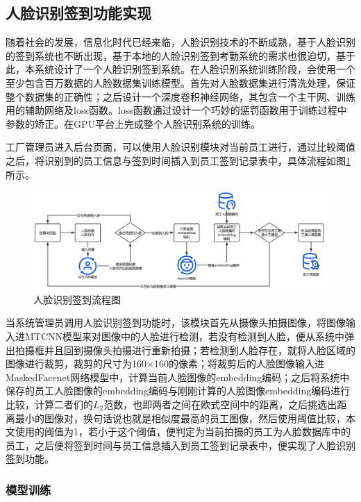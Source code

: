 \subsection{人脸识别签到功能实现}

随着社会的发展，信息化时代已经来临，人脸识别技术的不断成熟，基于人脸识别的签到系统也不断出现，基于本地的人脸识别签到考勤系统的需求也很迫切，基于此，本系统设计了一个人脸识别签到系统。在人脸识别系统训练阶段，会使用一个至少包含百万数据的人脸数据集训练模型。首先对人脸数据集进行清洗处理，保证整个数据集的正确性；之后设计一个深度卷积神经网络，其包含一个主干网、训练用的辅助网络及loss函数。loss函数通过设计一个巧妙的惩罚函数用于训练过程中参数的矫正。在GPU平台上完成整个人脸识别系统的训练。

工厂管理员进入后台页面，可以使用人脸识别模块对当前员工进行，通过比较阈值之后，将识别到的员工信息与签到时间插入到员工签到记录表中，具体流程如图\ref{fig:fcprcs}所示。

\begin{figure}[H]
    \centering
    \includegraphics[width=\textwidth]{figures/5fcprcs.png}
    \caption{人脸识别签到流程图}
    \label{fig:fcprcs}
\end{figure}

当系统管理员调用人脸识别签到功能时，该模块首先从摄像头拍摄图像，将图像输入进MTCNN模型来对图像中的人脸进行检测，若没有检测到人脸，便从系统中弹出拍摄框并且回到摄像头拍摄进行重新拍摄；若检测到人脸存在，就将人脸区域的图像进行裁剪，裁剪的尺寸为160$\times$160的像素；将裁剪后的人脸图像输入进MaskedFacenet网络模型中，计算当前人脸图像的embedding编码；之后将系统中保存的员工人脸图像的embedding编码与刚刚计算的人脸图像embedding编码进行比较，计算二者们的$L_2$范数，也即两者之间在欧式空间中的距离，之后挑选出距离最小的图像对，换句话说也就是相似度最高的员工图像，然后使用阈值比较，本文使用的阈值为1，若小于这个阈值，便判定为当前拍摄的员工为人脸数据库中的员工，之后便将签到时间与员工信息插入到员工签到记录表中，便实现了人脸识别签到功能。

\subsubsection{模型训练}

